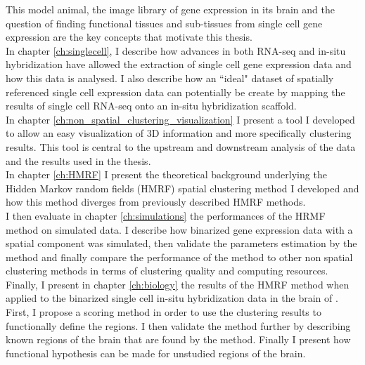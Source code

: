 	This model animal, the image library of gene expression in its brain and the question of finding functional tissues and sub-tissues from single cell gene expression are the key concepts that motivate this thesis.\\
	
	In chapter \ref{ch:singlecell}, I describe how advances in both RNA-seq and in-situ hybridization have allowed the extraction of single cell gene expression data and how this data is analysed. I also describe how an ``ideal" dataset of spatially referenced single cell expression data can potentially be create by mapping the results of single cell RNA-seq onto an in-situ hybridization scaffold.\\
	
	In chapter \ref{ch:non_spatial_clustering_visualization} I present a tool I developed to allow an easy visualization of 3D information and more specifically clustering results. This tool is central to the upstream and downstream analysis of the data and the results used in the thesis.\\
	
	In chapter \ref{ch:HMRF} I  present the theoretical background underlying the Hidden Markov random fields (HMRF) spatial clustering method I developed and how this method diverges from previously described HMRF methods. \\
	
	I then evaluate in chapter \ref{ch:simulations} the performances of the HRMF method on simulated data. I describe how binarized gene expression data with a spatial component was simulated, then validate the parameters estimation by the method and finally compare the performance of the method to other non spatial clustering methods in terms of clustering quality and computing resources.\\
	
	Finally, I present in chapter \ref{ch:biology} the results of the HMRF method when applied to the binarized single cell in-situ hybridization data in the brain of \platyfull{}. First, I propose a scoring method in order to use the clustering results to functionally define the regions. I then validate the method further by describing known regions of the brain that are found by the method. Finally I present how functional hypothesis can be made for unstudied regions of the brain.
	
	
	

%
%
%
%
%



